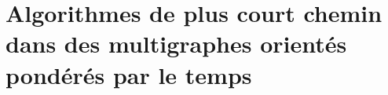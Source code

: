
\section{Algorithmes de plus court chemin dans des multigraphes orientés pondérés par le temps}
\label{sec:algos}


